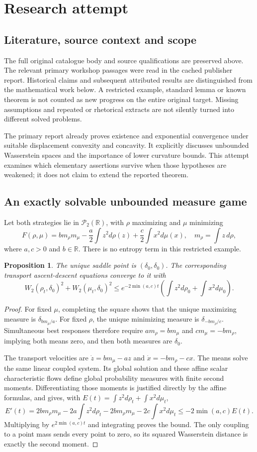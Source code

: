 \documentclass[11pt]{article}
\newtheorem{proposition}{Proposition}
\begin{document}
\section{Research attempt}
\subsection{Literature, source context and scope}
The full original catalogue body and source qualifications are preserved above. The relevant primary workshop passages were read in the cached publisher report. Historical claims and subsequent attributed results are distinguished from the mathematical work below. A restricted example, standard lemma or known theorem is not counted as new progress on the entire original target. Missing assumptions and repeated or rhetorical extracts are not silently turned into different solved problems.

The primary report already proves existence and exponential convergence under suitable displacement convexity and concavity. It explicitly discusses unbounded Wasserstein spaces and the importance of lower curvature bounds. This attempt examines which elementary assertions survive when those hypotheses are weakened; it does not claim to extend the reported theorem.
\subsection{An exactly solvable unbounded measure game}
Let both strategies lie in $\mathcal P_2(\mathbb R)$, with $\rho$ maximizing and $\mu$ minimizing
\[
 F(\rho,\mu)=b m_\rho m_\mu-\frac a2\int z^2d\rho(z)+\frac c2\int x^2d\mu(x),
 \quad m_\rho=\int z\,d\rho,
\]
where $a,c>0$ and $b\in\mathbb R$. There is no entropy term in this restricted example.
\begin{proposition}
The unique saddle point is $(\delta_0,\delta_0)$. The corresponding transport ascent-descent equations converge to it with
\[
 W_2(\rho_t,\delta_0)^2+W_2(\mu_t,\delta_0)^2
 \le e^{-2\min(a,c)t}\left(\int z^2d\rho_0+\int x^2d\mu_0\right).
\]
\end{proposition}
\begin{proof}
For fixed $\mu$, completing the square shows that the unique maximizing measure is $\delta_{bm_\mu/a}$. For fixed $\rho$, the unique minimizing measure is $\delta_{-bm_\rho/c}$. Simultaneous best responses therefore require $a m_\rho=b m_\mu$ and $c m_\mu=-b m_\rho$, implying both means zero, and then both measures are $\delta_0$.

The transport velocities are $\dot z=b m_\mu-a z$ and $\dot x=-b m_\rho-c x$. The means solve the same linear coupled system. Its global solution and these affine scalar characteristic flows define global probability measures with finite second moments. Differentiating those moments is justified directly by the affine formulas, and gives, with $E(t)=\int z^2d\rho_t+\int x^2d\mu_t$,
\[
 E'(t)=2b m_\rho m_\mu-2a\int z^2d\rho_t-2b m_\rho m_\mu-2c\int x^2d\mu_t
 \le-2\min(a,c)E(t).
\]
Multiplying by $e^{2\min(a,c)t}$ and integrating proves the bound. The only coupling to a point mass sends every point to zero, so its squared Wasserstein distance is exactly the second moment.
\end{proof}
\end{document}
